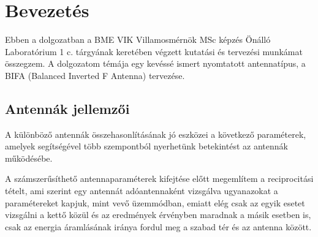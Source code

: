 \chapter{Bevezetés}
Ebben a dolgozatban a BME VIK Villamosmérnök MSc képzés Önálló Laboratórium 1 c. tárgyának keretében végzett kutatási és tervezési munkámat összegzem. A dolgozatom témája egy kevéssé ismert nyomtatott antennatípus, a BIFA (Balanced Inverted F Antenna) tervezése.
\section{Antennák jellemzői}
	A különböző antennák összehasonlításának jó eszközei a következő paraméterek, amelyek segítségével több szempontból nyerhetünk betekintést az antennák működésébe.
\par A számszerűsíthető antennaparaméterek kifejtése előtt megemlítem a reciprocitási tételt, ami szerint egy antennát adóantennaként vizsgálva ugyanazokat a paramétereket kapjuk, mint vevő üzemmódban, emiatt elég csak az egyik esetet vizsgálni a kettő közül és az eredmények érvényben maradnak a másik esetben is, csak az energia áramlásának iránya fordul meg a szabad tér és az antenna között.
